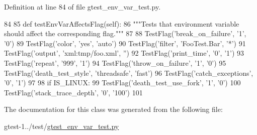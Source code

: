 \-Definition at line 84 of file gtest\-\_\-env\-\_\-var\-\_\-test.\-py.


\begin{DoxyCode}
84 
85   def testEnvVarAffectsFlag(self):
86     """Tests that environment variable should affect the corresponding flag."""
87 
88     TestFlag('break_on_failure', '1', '0')
89     TestFlag('color', 'yes', 'auto')
90     TestFlag('filter', 'FooTest.Bar', '*')
91     TestFlag('output', 'xml:tmp/foo.xml', '')
92     TestFlag('print_time', '0', '1')
93     TestFlag('repeat', '999', '1')
94     TestFlag('throw_on_failure', '1', '0')
95     TestFlag('death_test_style', 'threadsafe', 'fast')
96     TestFlag('catch_exceptions', '0', '1')
97 
98     if IS_LINUX:
99       TestFlag('death_test_use_fork', '1', '0')
100       TestFlag('stack_trace_depth', '0', '100')
101 

\end{DoxyCode}


\-The documentation for this class was generated from the following file\-:\begin{DoxyCompactItemize}
\item 
gtest-\/1../test/\hyperlink{gtest__env__var__test_8py}{gtest\-\_\-env\-\_\-var\-\_\-test.\-py}\end{DoxyCompactItemize}
